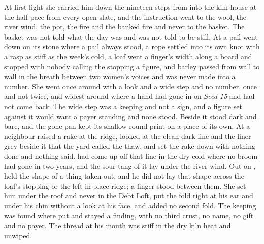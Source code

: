 At first light she carried him down the nineteen steps from  into the kiln-house at the half-pace from every open slate, and the instruction went to the wool, the river wind, the pot, the fire and the banked fire and never to the basket. The basket was not told what the day was and was not told to be still. At  a pail went down on its stone where a pail always stood, a rope settled into its own knot with a rasp as stiff as the week's cold, a loaf went a finger's width along a board and stopped with nobody calling the stopping a figure, and barley passed from wall to wall in the breath between two women's voices and was never made into a number. She went once around  with a look and a wide step and no number, once and not twice, and widest around  where a hand had gone in on \emph{Seed 15} and had not come back. The wide step was a keeping and not a sign, and a figure set against it would want a payer standing and none stood. Beside it  stood dark and bare, and the gone pan kept its shallow round print on a place of its own. At  a neighbour raised a rake at the ridge, looked at the clean dark line and the finer grey beside it that the yard called the thaw, and set the rake down with nothing done and nothing said.  had come up off that line in the dry cold where no broom had gone in two years, and the sour tang of it lay under the river wind. Out on ,  held the shape of a thing taken out, and he did not lay that shape across the loaf's stopping or the left-in-place ridge; a finger stood between them. She set him under the roof and never in the Debt Loft, put the fold right at his ear and under his chin without a look at his face, and added no second fold. The keeping was found where put and stayed a finding, with no third crust, no name, no gift and no payer. The thread at his mouth was stiff in the dry kiln heat and unwiped.

